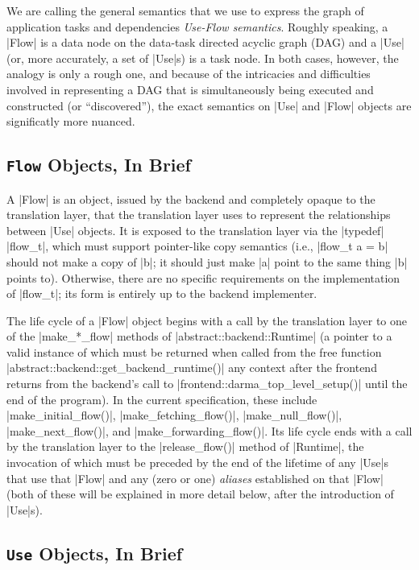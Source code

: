 We are calling the general semantics that we use to express the graph of application tasks and
dependencies {\it Use-Flow semantics}.  Roughly speaking, a |Flow| is a data node on the data-task
directed acyclic graph (DAG) and a |Use| (or, more accurately, a set of |Use|s) is a task node.  In
both cases, however, the analogy is only a rough one, and because of the intricacies and
difficulties involved in representing a DAG that is simultaneously being executed and constructed
(or ``discovered''), the exact semantics on |Use| and |Flow| objects are significatly more nuanced.

\subsection{{\tt Flow} Objects, In Brief}

A |Flow| is an object, issued by the backend and completely opaque to the translation layer, that
the translation layer uses to represent the relationships between |Use| objects.  It is exposed to
the translation layer via the |typedef| |flow_t|, which must support pointer-like copy semantics
(i.e., |flow_t a = b| should not make a copy of |b|; it should just make |a| point to the same
thing |b| points to).  Otherwise, there are no specific requirements on the implementation of
|flow_t|; its form is entirely up to the backend implementer.

The life cycle of a |Flow| object begins with a call by the translation layer to one of the
|make_*_flow| methods of |abstract::backend::Runtime| (a pointer to a valid instance of which must
be returned when called from the free function |abstract::backend::get_backend_runtime()| any
context after the frontend returns from the backend's call to |frontend::darma_top_level_setup()|
until the end of the program).  In the current specification, these
include |make_initial_flow()|, |make_fetching_flow()|, |make_null_flow()|, |make_next_flow()|,
and |make_forwarding_flow()|.  Its life cycle ends with a call by the translation layer to
the |release_flow()| method of |Runtime|, the invocation of which must be preceded by the 
end of the lifetime of any |Use|s that use that |Flow| and any (zero or one) {\it aliases}
established on that |Flow| (both of these will be explained in more detail below, after the
introduction of |Use|s).

\subsection{{\tt Use} Objects, In Brief}

